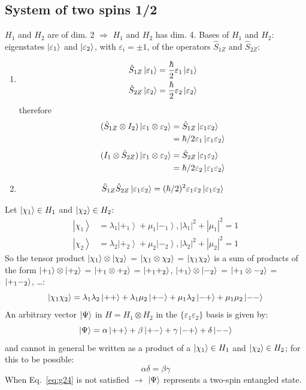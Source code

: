 \documentclass[12pt]{article}
\newcommand{\be}{\begin{equation}}
\newcommand{\ee}{\end{equation}}
\begin{document}
\subsection{System of two spins 1/2}

$H_1$ and $H_2$ are of dim. 2 $\Rightarrow$ $H_1$ and $H_2$ has dim. 4.
Bases of $H_1$ and $H_2$: eigenstates $\ket{\varepsilon_1}$ and $\ket{\varepsilon_2}$,
with $\varepsilon_i = \pm 1$, of the operators $\hat{S}_{1Z}$ and $\hat{S}_{2Z}$:
\begin{enumerate}
\item
\be
\begin{aligned}
\hat{S}_{1Z} \ket{\varepsilon_1} &= \frac{\hbar}{2} \varepsilon_1 \ket{\varepsilon_1}\\
\hat{S}_{2Z} \ket{\varepsilon_2} &= \frac{\hbar}{2} \varepsilon_2 \ket{\varepsilon_2}
\end{aligned}
\ee
therefore
\be
\begin{aligned}
(\hat{S}_{1Z} \otimes I_2) \ket{\varepsilon_1 \otimes \varepsilon_2} &= \hat{S}_{1Z} \ket{\varepsilon_1 \varepsilon_2}\\
&=\hbar/2 \varepsilon_1 \ket{\varepsilon_1 \varepsilon_2}
\end{aligned}
\ee
\be
\begin{aligned}
(I_1 \otimes \hat{S}_{2Z}) \ket{\varepsilon_1 \otimes \varepsilon_2} &= \hat{S}_{2Z} \ket{\varepsilon_1 \varepsilon_2}\\
&=\hbar/2 \varepsilon_2 \ket{\varepsilon_1 \varepsilon_2}
\end{aligned}
\ee
%
\item
\be
\hat{S}_{1Z}\hat{S}_{2Z} \ket{\varepsilon_1 \varepsilon_2} = (\hbar/2)^2 \varepsilon_1 \varepsilon_2 \ket{\varepsilon_1 \varepsilon_2}
\ee
\end{enumerate}

Let $\ket{\chi_1} \in H_1$ and $\ket{\chi_2} \in H_2$: 
\be
\begin{aligned}
\left|\chi_{1}\right\rangle&=\lambda_{1}\left|+_{1}\right\rangle+\mu_{1}\left|-_{1}\right\rangle,\left|\lambda_{1}\right|^{2}+\left|\mu_{1}\right|^{2}=1\\
\left|\chi_{2}\right\rangle&=\lambda_{2}\left|+_{2}\right\rangle+\mu_{2}\left|-_{2}\right\rangle,\left|\lambda_{2}\right|^{2}+\left|\mu_{2}\right|^{2}=1
\end{aligned}
\ee
So the tensor product 
$\ket{\chi_1} \otimes \ket{\chi_2}$ = $\ket{\chi_1\otimes\chi_2}$ = $\ket{\chi_1\chi_2}$ 
is a sum of products of the form
$\ket{+_1} \otimes \ket{+_2}$ = $\ket{+_1\otimes+_2}$ = $\ket{+_1+_2}$,
$\ket{+_1} \otimes \ket{-_2}$ = $\ket{+_1\otimes-_2}$ = $\ket{+_1-_2}$,
\ldots:
\be
\ket{\chi_1\chi_2} = \lambda_1\lambda_2 \ket{++} + \lambda_1\mu_2 \ket{+-} +  \mu_1\lambda_2 \ket{-+} +  \mu_1\mu_2 \ket{--}
\ee
An arbitrary vector $\ket{\Psi}$ in $H = H_1 \otimes H_2$ in the $\{\varepsilon_1\varepsilon_2\}$ basis is given by:
\be
\ket{\Psi} = \alpha \ket{++} + \beta \ket{+-} +  \gamma \ket{-+} +  \delta \ket{--}
\ee
and cannot in general be written as a product of a $\ket{\chi_1} \in H_1$ and $\ket{\chi_2} \in H_2$; for this to be possible:
\be
\alpha\delta = \beta\gamma
\label{eq:g24}
\ee
When Eq.~\eqref{eq:g24} is not satisfied $\rightarrow$ $\ket{\Psi}$ represents a two-spin entangled state.
\end{document}
